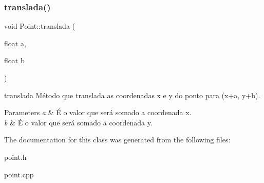 \subsubsection{\texorpdfstring{translada()}{translada()}}
{\footnotesize\ttfamily void Point\+::translada (\begin{DoxyParamCaption}\item[{float}]{a,  }\item[{float}]{b }\end{DoxyParamCaption})}



translada Método que translada as coordenadas x e y do ponto para (x+a, y+b). 


\begin{DoxyParams}{Parameters}
{\em a} & É o valor que será somado a coordenada x. \\
\hline
{\em b} & É o valor que será somado a coordenada y. \\
\hline
\end{DoxyParams}


The documentation for this class was generated from the following files\+:\begin{DoxyCompactItemize}
\item 
point.\+h\item 
point.\+cpp\end{DoxyCompactItemize}
